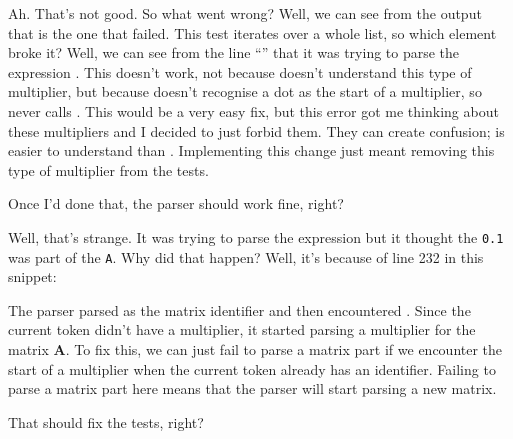 \documentclass[../development.tex]{subfiles}
\begin{document}

Ah. That's not good. So what went wrong? Well, we can see from the output that  is the one that failed. This test iterates over a whole list, so which element broke it? Well, we can see from the line \enquote{} that it was trying to parse the expression . This doesn't work, not because  doesn't understand this type of multiplier, but because  doesn't recognise a dot as the start of a multiplier, so never calls . This would be a very easy fix, but this error got me thinking about these multipliers and I decided to just forbid them. They can create confusion;  is easier to understand than . Implementing this change just meant removing this type of multiplier from the tests.

Once I'd done that, the parser should work fine, right?


Well, that's strange. It was trying to parse the expression  but it thought the \texttt{0.1} was part of the \texttt{A}. Why did that happen? Well, it's because of line 232 in this snippet:


The parser parsed  as the matrix identifier and then encountered . Since the current token didn't have a multiplier, it started parsing a multiplier for the matrix $\mathbf{A}$. To fix this, we can just fail to parse a matrix part if we encounter the start of a multiplier when the current token already has an identifier. Failing to parse a matrix part here means that the parser will start parsing a new matrix.


That should fix the tests, right?

\end{document}
